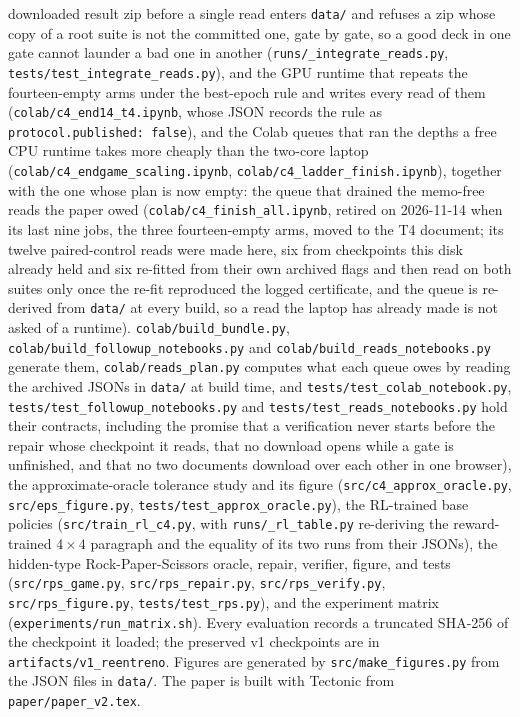 \documentclass[conference]{IEEEtran}
\begin{document}
downloaded result zip before a single read enters \texttt{data/} and refuses a zip whose copy of a
root suite is not the committed one, gate by gate, so a good deck in one gate cannot launder a bad
one in another (\texttt{runs/\_integrate\_reads.py}, \texttt{tests/test\_integrate\_reads.py}), and
the GPU runtime that repeats the fourteen-empty arms under the best-epoch rule and writes every read of them (\texttt{colab/c4\_end14\_t4.ipynb}, whose JSON records the rule as \texttt{protocol.published: false}), and the Colab queues that ran the depths a free CPU runtime takes more cheaply than the two-core laptop (\texttt{colab/c4\_endgame\_scaling.ipynb}, \texttt{colab/c4\_ladder\_finish.ipynb}), together with the one whose plan is now empty: the queue that drained the memo-free reads the paper owed (\texttt{colab/c4\_finish\_all.ipynb}, retired on 2026-11-14 when its last nine jobs, the three fourteen-empty arms, moved to the T4 document; its twelve paired-control reads were made here, six from checkpoints this disk already held and six re-fitted from their own archived flags and then read on both suites only once the re-fit reproduced the logged certificate, and the queue is re-derived from \texttt{data/} at every build, so a read the laptop has already made is not asked of a runtime). \texttt{colab/build\_bundle.py}, \texttt{colab/build\_followup\_notebooks.py} and \texttt{colab/build\_reads\_notebooks.py} generate them, \texttt{colab/reads\_plan.py} computes what each queue owes by reading the archived JSONs in \texttt{data/} at build time, and \texttt{tests/test\_colab\_notebook.py}, \texttt{tests/test\_followup\_notebooks.py} and \texttt{tests/test\_reads\_notebooks.py} hold their contracts, including the promise that a verification never starts before the repair whose checkpoint it reads, that no download opens while a gate is unfinished, and that no two documents download over each other in one browser), the approximate-oracle tolerance study and its figure (\texttt{src/c4\_approx\_oracle.py}, \texttt{src/eps\_figure.py}, \texttt{tests/test\_approx\_oracle.py}), the RL-trained base policies (\texttt{src/train\_rl\_c4.py}, with \texttt{runs/\_rl\_table.py} re-deriving the reward-trained $4\times4$ paragraph and the equality of its two runs from their JSONs), the hidden-type Rock-Paper-Scissors oracle, repair, verifier, figure, and tests (\texttt{src/rps\_game.py}, \texttt{src/rps\_repair.py}, \texttt{src/rps\_verify.py}, \texttt{src/rps\_figure.py}, \texttt{tests/test\_rps.py}), and the experiment matrix (\texttt{experiments/run\_matrix.sh}). Every evaluation records a truncated SHA-256 of the checkpoint it loaded; the preserved v1 checkpoints are in \texttt{artifacts/v1\_reentreno}. Figures are generated by \texttt{src/make\_figures.py} from the JSON files in \texttt{data/}. The paper is built with Tectonic from \texttt{paper/paper\_v2.tex}.
\end{document}
